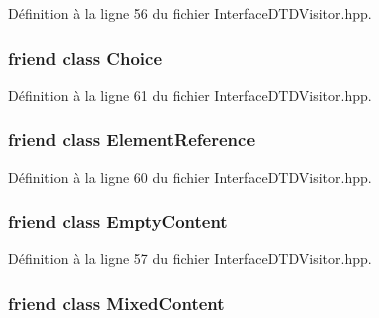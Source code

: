 Définition à la ligne 56 du fichier InterfaceDTDVisitor.hpp.

\hypertarget{classdtd_1_1_interface_d_t_d_visitor_af8084f88f5641132057732496deab026}{
\subsubsection[{Choice}]{\setlength{\rightskip}{0pt plus 5cm}friend class {\bf Choice}}}
\label{classdtd_1_1_interface_d_t_d_visitor_af8084f88f5641132057732496deab026}


Définition à la ligne 61 du fichier InterfaceDTDVisitor.hpp.

\hypertarget{classdtd_1_1_interface_d_t_d_visitor_a21b7004458ebe5b88f6d6edb6d059a34}{
\subsubsection[{ElementReference}]{\setlength{\rightskip}{0pt plus 5cm}friend class {\bf ElementReference}}}
\label{classdtd_1_1_interface_d_t_d_visitor_a21b7004458ebe5b88f6d6edb6d059a34}


Définition à la ligne 60 du fichier InterfaceDTDVisitor.hpp.

\hypertarget{classdtd_1_1_interface_d_t_d_visitor_a91eaa900fb18be6cd9a7105c964666fb}{
\subsubsection[{EmptyContent}]{\setlength{\rightskip}{0pt plus 5cm}friend class {\bf EmptyContent}}}
\label{classdtd_1_1_interface_d_t_d_visitor_a91eaa900fb18be6cd9a7105c964666fb}


Définition à la ligne 57 du fichier InterfaceDTDVisitor.hpp.

\hypertarget{classdtd_1_1_interface_d_t_d_visitor_a94c4de9fad580ef7aa4f384bf0c2b861}{
\subsubsection[{MixedContent}]{\setlength{\rightskip}{0pt plus 5cm}friend class {\bf MixedContent}}}
\label{classdtd_1_1_interface_d_t_d_visitor_a94c4de9fad580ef7aa4f384bf0c2b861}


